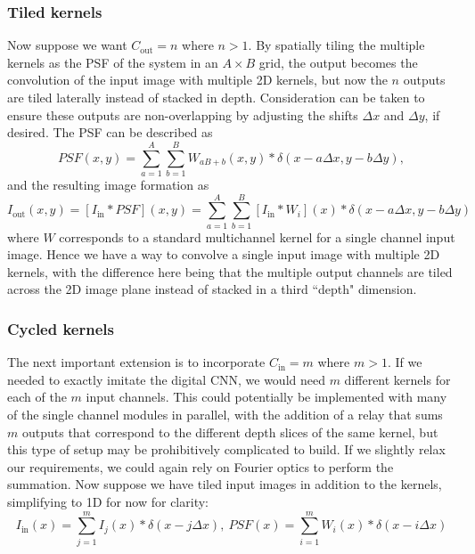 \subsubsection*{Tiled kernels} Now suppose we want $C_\text{out} = n$ where $n >1$. By spatially tiling the multiple kernels as the PSF of the system in an $A \times B$ grid, the output becomes the convolution of the input image with multiple 2D kernels, but now the $n$ outputs are tiled laterally instead of stacked in depth. Consideration can be taken to ensure these outputs are non-overlapping by adjusting the shifts $\Delta x$ and $\Delta y$, if desired. The PSF can be described as
\begin{equation}
{PSF}(x,y) = \sum_{a = 1}^{A}\sum_{b = 1}^{B} W_{aB+b} (x,y) * \delta(x - a\Delta x, y - b\Delta y),
\end{equation}
and the resulting image formation as
\begin{equation}
I_\text{out}(x,y) = [I_\text{in} * PSF](x,y) =\sum_{a = 1}^{A}\sum_{b = 1}^{B}  [I_\text{in} * W_i](x) * \delta(x - a\Delta x, y - b \Delta y)
\end{equation}
where $W$ corresponds to a standard multichannel kernel for a single channel input image. Hence we have a way to convolve a single input image with multiple 2D kernels, with the difference here being that the multiple output channels are tiled across the 2D image plane instead of stacked in a third ``depth" dimension.

\subsubsection*{Cycled kernels}
The next important extension is to incorporate $C_\text{in} = m$ where $m > 1$. If we needed to exactly imitate the digital CNN, we would need $m$ different kernels for each of the $m$ input channels. This could potentially be implemented with many of the single channel modules in parallel, with the addition of a relay that sums $m$ outputs that correspond to the different depth slices of the same kernel, but this type of setup may be prohibitively complicated to build. If we slightly relax our requirements, we could again rely on Fourier optics to perform the summation. Now suppose we have tiled input images in addition to the kernels, simplifying to 1D for now for clarity:
\begin{equation} I_\text{in}(x) = \sum_{j = 1}^m I_j(x)  * \delta(x - j\Delta x),\  PSF(x) = \sum_{i = 1}^m W_i(x)  * \delta(x - i\Delta x)\end{equation}

